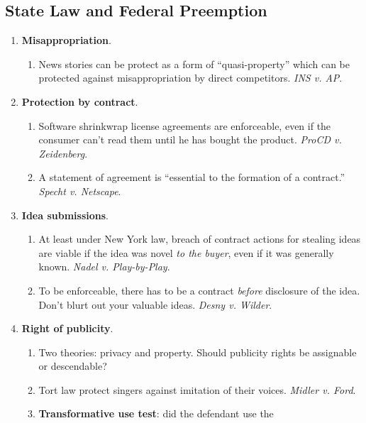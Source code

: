 \newpage

\subsection{State Law and Federal Preemption}

\begin{enumerate}
    \item \textbf{Misappropriation}.
    \begin{enumerate}
        \item News stories can be protect as a form of ``quasi-property'' 
        which can be protected against misappropriation by direct competitors. 
        \emph{INS v. AP}.
    \end{enumerate}
    \item \textbf{Protection by contract}.
    \begin{enumerate}
        \item Software shrinkwrap license agreements are enforceable, even if 
        the consumer can't read them until he has bought the product. 
        \emph{ProCD v. Zeidenberg}.
        \item A statement of agreement is ``essential to the formation of a 
        contract.'' \emph{Specht v. Netscape}.
    \end{enumerate}
    \item \textbf{Idea submissions}.
    \begin{enumerate}
        \item At least under New York law, breach of contract actions for 
        stealing ideas are viable if the idea was novel \emph{to the buyer}, 
        even if it was generally known. \emph{Nadel v. Play-by-Play}.
        \item To be enforceable, there has to be a contract \emph{before} 
        disclosure of the idea. Don't blurt out your valuable ideas. 
        \emph{Desny v. Wilder}.
    \end{enumerate}
    \item \textbf{Right of publicity}.
    \begin{enumerate}
        \item Two theories: privacy and property. Should publicity rights be 
        assignable or descendable?
        \item Tort law protect singers against imitation of their voices. 
        \emph{Midler v. Ford}.
        \item \textbf{Transformative use test}: did the defendant use the 

\end{enumerate}
\end{enumerate}
